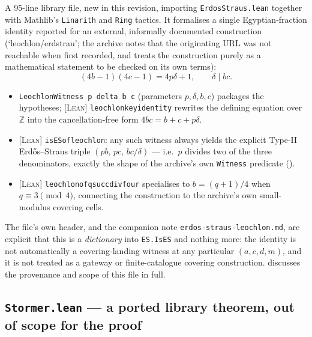 \documentclass[11pt]{article}
\theoremstyle{plain}
\theoremstyle{definition}
\theoremstyle{remark}
\newcommand{\LEAN}{\textcolor{proved}{\textsc{[Lean]}}}
\newcommand{\file}[1]{\texttt{#1}}
\newcommand{\lean}[1]{\texttt{#1}}
\renewcommand{\_}{\textunderscore\allowbreak}
\newcommand{\Z}{\mathbb{Z}}
\begin{document}
A 95-line library file, new in this revision, importing \file{ErdosStraus.lean} together with
Mathlib's \lean{Linarith} and \lean{Ring} tactics. It formalises a single Egyptian-fraction
identity reported for an external, informally documented construction (`leochlon/erdstrau'; the
archive notes that the originating URL was not reachable when first recorded, and treats the
construction purely as a mathematical statement to be checked on its own terms):
\[
(4b-1)(4c-1) = 4p\delta+1, \qquad \delta\mid bc.
\]
\begin{itemize}[leftmargin=1.4em]
  \item \lean{LeochlonWitness p delta b c} (parameters $p,\delta,b,c$) packages the hypotheses; \LEAN{}
        \lean{leochlon\_key\_identity} rewrites the defining equation over $\Z$ into the
        cancellation-free form $4bc = b+c+p\delta$.
  \item \LEAN{} \lean{isES\_of\_leochlon}: any such witness always yields the explicit Type-II
        Erd\H{o}s--Straus triple $(pb,\,pc,\,bc/\delta)$ — i.e.\ $p$ divides two of the three
        denominators, exactly the shape of the archive's own \lean{Witness} predicate
        ().
  \item \LEAN{} \lean{leochlon\_of\_q\_succ\_div\_four} specialises to $b=(q+1)/4$ when
        $q\equiv3\pmod4$, connecting the construction to the archive's own small-modulus
        covering cells.
\end{itemize}
The file's own header, and the companion note \texttt{erdos-\allowbreak straus-\allowbreak leochlon.md}, are explicit
that this is a \emph{dictionary} into \lean{ES.IsES} and nothing more: the identity is not
automatically a covering-landing witness at any particular $(a,c,d,m)$, and it is not treated as
a gateway or finite-catalogue covering construction.  discusses the provenance
and scope of this file in full.

\subsection{\lean{Stormer.lean} — a ported library theorem, out of scope for the proof}
\label{subsec:stormer}
\end{document}
